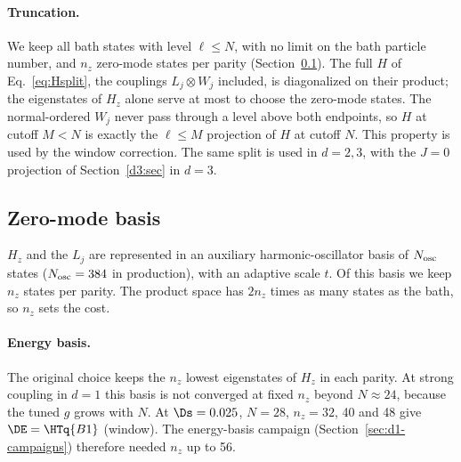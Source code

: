 \paragraph{Truncation.} We keep all bath states with level $\ell\le N$, with no limit on the bath particle number, and
$n_z$ zero-mode states per parity (Section~\ref{sec:zerobasis}). The full $H$ of Eq.~\eqref{eq:Hsplit}, the couplings
$L_j\otimes W_j$ included, is diagonalized on their product; the eigenstates of $H_z$ alone serve at most to choose
the zero-mode states. The normal-ordered $W_j$ never pass through a level above both endpoints, so $H$ at cutoff $M<N$ is exactly the
$\ell\le M$ projection of $H$ at cutoff $N$. This property is used by the window correction. The same split is used
in $d=2,3$, with the $J=0$ projection of Section~\ref{d3:sec} in $d=3$.

\subsection{Zero-mode basis}\label{sec:zerobasis}
$H_z$ and the $L_j$ are represented in an auxiliary harmonic-oscillator basis of $N_{\rm osc}$ states
($N_{\rm osc}=384$ in production), with an adaptive scale $t$. Of this basis we keep $n_z$ states per parity. The product space has $2n_z$ times as many
states as the bath, so $n_z$ sets the cost.

\paragraph{Energy basis.} The original choice keeps the $n_z$ lowest eigenstates of $H_z$ in each parity. At strong
coupling in $d=1$ this basis is not converged at fixed $n_z$ beyond $N\approx24$, because the tuned $g$ grows with
$N$. At $\Ds=0.025$, $N=28$, $n_z=32$, 40 and 48 give $\DE=\HTq{B1}$ (window). The energy-basis campaign
 (Section~\ref{sec:d1-campaigns}) therefore needed $n_z$ up to 56.

